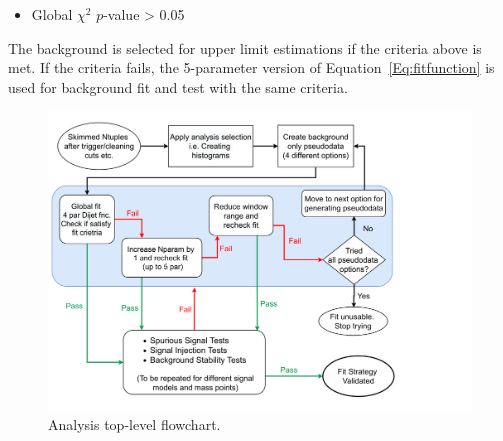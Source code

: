 \begin{itemize}
	\item Global $\chi^2$ $p$-value > 0.05
\end{itemize}

The background is selected for upper limit estimations if the criteria above is met. If the criteria fails, the 5-parameter version of Equation~\ref{Eq:fitfunction} is
used for background fit and test with the same criteria. 


 
\begin{figure}[htb]
\centering
\includegraphics[width=1.2\textwidth]{fig/flowcharts/QGDijet-FlowChart-30March}
\caption{Analysis top-level flowchart.
\label{eflow}}
\end{figure}
%
%
